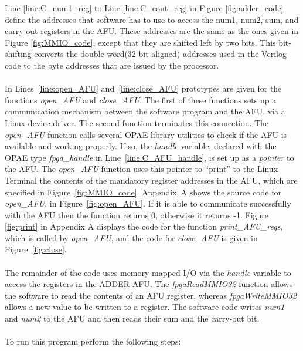 \documentclass[11pt, twoside, pdftex]{article}
\begin{document}
 
 \noindent
 Line \ref{line:C_num1_reg} to Line \ref{line:C_cout_reg} in Figure \ref{fig:adder_code} define the addresses that software has to use to access the num1, num2, sum, and carry-out registers in the AFU. These addresses are the same as the ones given in Figure \ref{fig:MMIO_code}, except that they are shifted left by two bits. This bit-shifting converts the double-word(32-bit aligned) addresses used in the Verilog code to the byte addresses that are issued by the processor.\\
 \\
In Lines~\ref{line:open_AFU} and~\ref{line:close_AFU} prototypes are given for the functions {\it open\_AFU} and {\it close\_AFU}. The first of these functions sets up a communication mechanism between the software program and the AFU, via a Linux device driver. The second function terminates this connection. The {\it open\_AFU} function calls several OPAE library utilities to check if the AFU is available and working properly. If so, the {\it handle} variable, declared with the OPAE type {\it fpga\_handle} in Line~\ref{line:C_AFU_handle}, is set up as a {\it pointer} to the AFU. The {\it open\_AFU} function uses this pointer to ``print'' to the Linux Terminal the contents of the mandatory register addresses in the AFU, which are specified in Figure~\ref{fig:MMIO_code}. Appendix~A shows the source code for {\it open\_AFU}, in Figure~\ref{fig:open_AFU}. If it is able to communicate successfully with the AFU then the function returns 0, otherwise it returns -1. Figure \ref{fig:print} in Appendix A displays the code for the function {\it print\_AFU\_regs}, which is called by {\it open\_AFU}, and the code for {\it close\_AFU} is given in Figure~\ref{fig:close}.\\
\\
The remainder of the code uses memory-mapped I/O via the {\it handle} variable to access the registers in the ADDER AFU. The {\it fpgaReadMMIO32} function allows the software to read the contents of an AFU register, whereas {\it fpgaWriteMMIO32} allows a new value to be written to a register. The software code writes {\it num1} and {\it num2} to the AFU and then reads their sum and the carry-out bit.\\
\\
To run this program perform the following steps:
\end{document}
